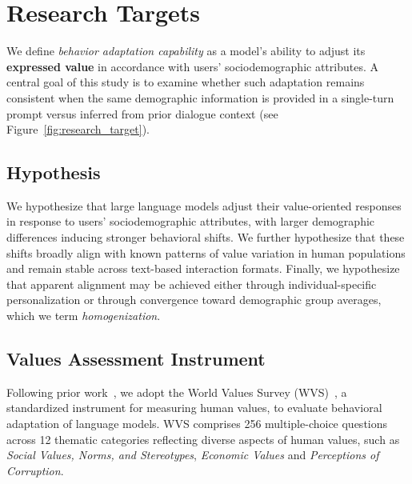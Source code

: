 \documentclass[11pt,a4paper]{article}
\begin{document}
\section{Research Targets}
\label{sec:research_targets}

We define \emph{behavior adaptation capability} as a model’s ability to adjust its \textbf{expressed value} in accordance with users' sociodemographic attributes. A central goal of this study is to examine whether such adaptation remains consistent when the same demographic information is provided in a single-turn prompt versus inferred from prior dialogue context (see Figure~\ref{fig:research_target}).


\subsection{Hypothesis}

We hypothesize that large language models adjust their value-oriented responses in response to users' sociodemographic attributes, with larger demographic differences inducing stronger behavioral shifts. We further hypothesize that these shifts broadly align with known patterns of value variation in human populations and remain stable across text-based interaction formats. Finally, we hypothesize that apparent alignment may be achieved either through individual-specific personalization or through convergence toward demographic group averages, which we term \emph{homogenization}.


\subsection{Values Assessment Instrument}

Following prior work~\cite{durmus2024towards, jiang2024can, zhao2024worldvaluesbenchlargescalebenchmarkdataset}, we adopt the World Values Survey (WVS)~\cite{Haerpfer2020-qe}, a standardized instrument for measuring human values, to evaluate behavioral adaptation of language models. WVS comprises 256 multiple-choice questions across 12 thematic categories reflecting diverse aspects of human values, such as \textit{Social Values, Norms, and Stereotypes}, \textit{Economic Values} and \textit{Perceptions of Corruption}.
\end{document}
